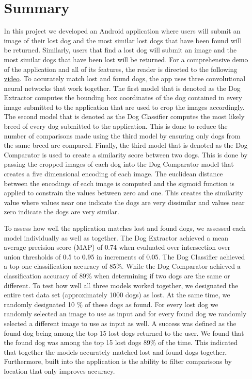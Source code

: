 \documentclass{article}
\begin{document}
\section{Summary}
	In this project we developed an Android application where users will submit an image of their lost dog and the most similar lost dogs that have been found will be returned.  Similarly, users that find a lost dog will submit an image and the most similar dogs that have been lost will be returned.  For a comprehensive demo of the application and all of its features, the reader is directed to the following \href{https://youtu.be/jVjqX4sfAKU}{video}.  To accurately match lost and found dogs, the app uses three convolutional neural networks that work together.  The first model that is denoted as the Dog Extractor computes the bounding box coordinates of the dog contained in every image submitted to the application that are used to crop the images accordingly.  The second model that is denoted as the Dog Classifier computes the most likely breed of every dog submitted to the application.  This is done to reduce the number of comparisons made using the third model by ensuring only dogs from the same breed are compared.  Finally, the third model that is denoted as the Dog Comparator is used to create a similarity score between two dogs.  This is done by passing the cropped images of each dog into the Dog Comparator model that creates a five dimensional encoding of each image.  The euclidean distance between the encodings of each image is computed and the sigmoid function is applied to constrain the values between zero and one.  This creates the similarity value where values near one indicate the dogs are very dissimilar and values near zero indicate the dogs are very similar.

	To assess how well the application matches lost and found dogs, we assessed each model individually as well as together.  The Dog Extractor achieved a mean average precision score (MAP) of 0.74 when evaluated over intersection over union thresholds of 0.5 to 0.95 in increments of 0.05.  The Dog Classifier achieved a top one classification accuracy of 85\%.  While the Dog Comparator achieved a classification accuracy of 89\% when determining if two dogs are the same or different.  To test how well all three models worked together, we designated the entire test data set (approximately 1000 dogs) as lost.  At the same time, we randomly designated 10 \% of these dogs as found.  For every lost dog we randomly selected an image to use as input and for every found dog we randomly selected a different image to use as input as well.   A success was defined as the found dog being among the top 15 lost dogs returned to the user.  We found that the found dog was among the top 15 lost dogs 89\% of the time.  This indicated that together the models accurately matched lost and found dogs together.  Furthermore, built into the application is the ability to filter comparisons by location that only improves accuracy.

\newpage



\end{document}
